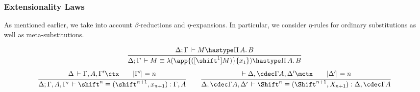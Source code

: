 \documentclass[copyright,creativecommons]{eptcs}
\makeatletter
\newcommand{\der}{\,\vdash}
\newcommand{\length}[1]{|#1|}
\newcommand{\ru}[2]{\dfrac{\begin{array}[b]{@{}c@{}} #1 \end{array}}{#2}}
\newcommand{\cxt}{\ctx}  \newcommand{\mcxt}{\mctx}
\newcommand{\shiftby}[1]{\shift^{#1}}
\newcommand{\Shiftby}[1]{\Shift^{#1}}
\newcommand{\mshiftby}{\Shiftby}
\newcommand{\esub}[1]{[#1]}
\makeatother
\begin{document}
\subsubsection{Extensionality Laws}
As mentioned earlier, we take into account $\beta$-reductions and
$\eta$-expansions. In particular, we consider $\eta$-rules for
ordinary substitutions as well as meta-substitutions. 

\[
\begin{array}{c}
\ru{\Delta; \Gamma \der M \hastype \fun A B 
  }{\Delta; \Gamma \der M \equiv 
      \lambda (\app {(\esub {\shiftby 1} M)} {x_1}) \hastype \fun A B
  }
\\[1.5em]
\ru{\Delta \der \Gamma,A,\Gamma' \cxt \qquad \length{\Gamma'} = n
  }{\Delta; \Gamma,A,\Gamma' \der \shiftby n \equiv (\shiftby {n+1}, x_{n+1}) : \Gamma,A}
\qquad
\ru{\der \Delta,\cdec \Gamma A,\Delta' \mcxt \qquad \length{\Delta'} = n
  }{\Delta, \cdec \Gamma A,\Delta' \der \mshiftby n \equiv (\mshiftby {n+1},
    X_{n+1}) : \Delta,\cdec \Gamma A}
\end{array}
\]
\end{document}
